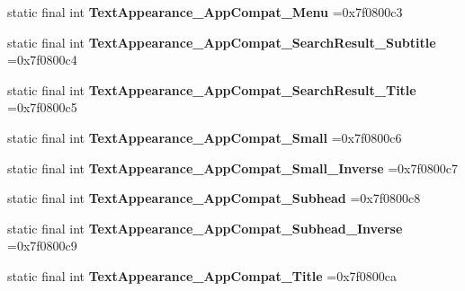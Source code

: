 \begin{DoxyCompactItemize}
\item 
\hypertarget{classcheck_1_1test_1_1_r_1_1style_ac2e489680c6f60658f3ee43d2bdd5227}{}static final int {\bfseries Text\+Appearance\+\_\+\+App\+Compat\+\_\+\+Menu} =0x7f0800c3\label{classcheck_1_1test_1_1_r_1_1style_ac2e489680c6f60658f3ee43d2bdd5227}

\item 
\hypertarget{classcheck_1_1test_1_1_r_1_1style_af79ec6714078ca2b7898450187353180}{}static final int {\bfseries Text\+Appearance\+\_\+\+App\+Compat\+\_\+\+Search\+Result\+\_\+\+Subtitle} =0x7f0800c4\label{classcheck_1_1test_1_1_r_1_1style_af79ec6714078ca2b7898450187353180}

\item 
\hypertarget{classcheck_1_1test_1_1_r_1_1style_a8f5279edd0d49968ceff265a5700fd45}{}static final int {\bfseries Text\+Appearance\+\_\+\+App\+Compat\+\_\+\+Search\+Result\+\_\+\+Title} =0x7f0800c5\label{classcheck_1_1test_1_1_r_1_1style_a8f5279edd0d49968ceff265a5700fd45}

\item 
\hypertarget{classcheck_1_1test_1_1_r_1_1style_a0443dab5cda2f60ddd4f224a8af8f983}{}static final int {\bfseries Text\+Appearance\+\_\+\+App\+Compat\+\_\+\+Small} =0x7f0800c6\label{classcheck_1_1test_1_1_r_1_1style_a0443dab5cda2f60ddd4f224a8af8f983}

\item 
\hypertarget{classcheck_1_1test_1_1_r_1_1style_a03581b00d3f21e93500664a376181efa}{}static final int {\bfseries Text\+Appearance\+\_\+\+App\+Compat\+\_\+\+Small\+\_\+\+Inverse} =0x7f0800c7\label{classcheck_1_1test_1_1_r_1_1style_a03581b00d3f21e93500664a376181efa}

\item 
\hypertarget{classcheck_1_1test_1_1_r_1_1style_a5e8e8c25562259824f5a903726eb989e}{}static final int {\bfseries Text\+Appearance\+\_\+\+App\+Compat\+\_\+\+Subhead} =0x7f0800c8\label{classcheck_1_1test_1_1_r_1_1style_a5e8e8c25562259824f5a903726eb989e}

\item 
\hypertarget{classcheck_1_1test_1_1_r_1_1style_a4331065cbb81b8c6deafd4154ad860b6}{}static final int {\bfseries Text\+Appearance\+\_\+\+App\+Compat\+\_\+\+Subhead\+\_\+\+Inverse} =0x7f0800c9\label{classcheck_1_1test_1_1_r_1_1style_a4331065cbb81b8c6deafd4154ad860b6}

\item 
\hypertarget{classcheck_1_1test_1_1_r_1_1style_a1423ab47cd18dbe233a2dd62cb05705c}{}static final int {\bfseries Text\+Appearance\+\_\+\+App\+Compat\+\_\+\+Title} =0x7f0800ca\label{classcheck_1_1test_1_1_r_1_1style_a1423ab47cd18dbe233a2dd62cb05705c}


\end{DoxyCompactItemize}
